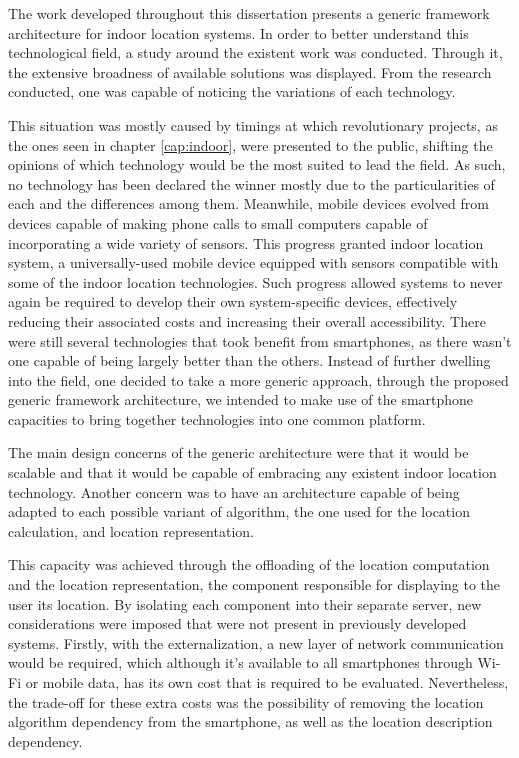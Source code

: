 \label{cap:conclusions}

The work developed throughout this dissertation presents a generic framework architecture for indoor location systems. In order to better understand this technological field, a study around the existent work was conducted. Through it, the extensive broadness of available solutions was displayed. From the research conducted, one was capable of noticing the variations of each technology. 
 
 
This situation was mostly caused by timings at which revolutionary projects, as the ones seen in chapter \ref{cap:indoor}, were presented to the public, shifting the opinions of which technology would be the most suited to lead the field. As such, no technology has been declared the winner mostly due to the particularities of each and the differences among them. Meanwhile, mobile devices evolved from devices capable of making phone calls to small computers capable of incorporating a wide variety of sensors. This progress granted indoor location system, a universally-used mobile device equipped with sensors compatible with some of the indoor location technologies. Such progress allowed systems to never again be required to develop their own system-specific devices, effectively reducing their associated costs and increasing their overall accessibility. There were still several technologies that took benefit from smartphones, as there wasn't one capable of being largely better than the others. Instead of further dwelling into the field, one decided to take a more generic approach, through the proposed generic framework architecture, we intended to make use of the smartphone capacities to bring together technologies into one common platform. 
 
 
The main design concerns of the generic architecture were that it would be scalable and that it would be capable of embracing any existent indoor location technology. Another concern was to have an architecture capable of being adapted to each possible variant of algorithm, the one used for the location calculation, and location representation. 

This capacity was achieved through the offloading of the location computation and the location representation, the component responsible for displaying to the user its location. By isolating each component into their separate server, new considerations were imposed that were not present in previously developed systems. Firstly, with the externalization, a new layer of network communication would be required, which although it's available to all smartphones through Wi-Fi or mobile data, has its own cost that is required to be evaluated. Nevertheless, the trade-off for these extra costs was the possibility of removing the location algorithm dependency from the smartphone, as well as the location description dependency.  
 
